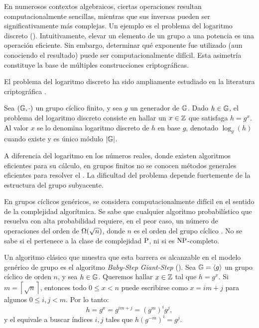 
En numerosos contextos algebraicos, ciertas operaciones resultan computacionalmente sencillas, mientras que sus inversas pueden ser significativamente más complejas. Un ejemplo es el problema del logaritmo discreto (\DLP). Intuitivamente, elevar un elemento de un grupo a una potencia es una operación eficiente. Sin embargo, determinar qué exponente fue utilizado (aun conociendo el resultado) puede ser computacionalmente difícil. Esta asimetría constituye la base de múltiples construcciones criptográficas.

El problema del logaritmo discreto ha sido ampliamente estudiado en la literatura criptográfica \cite{hac,katz}.

\begin{definition}[\DLP]
\label{def:apendice-a-dlp-dlp}
	Sea $(\mathbb{G}, \cdot)$ un grupo cíclico finito, y sea $g$ un generador de $\mathbb{G}$. Dado $h \in \mathbb{G}$, el problema del logaritmo discreto consiste en hallar un $x \in \mathbb{Z}$ que satisfaga $h = g^x$. Al valor $x$ se lo denomina logaritmo discreto de $h$ en base $g$, denotado $\log_g(h)$ cuando existe y es único módulo $|\mathbb{G}|$.
\end{definition}

A diferencia del logaritmo en los números reales, donde existen algoritmos eficientes para su cálculo, en grupos finitos no se conocen métodos generales eficientes para resolver el \DLP. La dificultad del problema depende fuertemente de la estructura del grupo subyacente.

En grupos cíclicos genéricos, \DLP se considera computacionalmente difícil en el sentido de la complejidad algorítmica. Se sabe que cualquier algoritmo probabilístico que resuelva \DLP con alta probabilidad requiere, en el peor caso, un número de operaciones del orden de $\Omega(\sqrt{n})$, donde $n$ es el orden del grupo cíclico \cite{shoup1997lowerbounds}. No se sabe si el \DLP pertenece a la clase de complejidad $\mathrm{P}$, ni si es $\mathrm{NP}$-completo.

Un algoritmo clásico que muestra que esta barrera es alcanzable en el modelo genérico de grupo es el algoritmo \textit{Baby-Step Giant-Step} (\BSGS). Sea $\mathbb{G} = \left\langle g \right\rangle$ un grupo cíclico de orden $n$, y sea $h \in \mathbb{G}$. Queremos hallar $x \in \mathbb{Z}$ tal que $h = g^x$. Si $m = \left\lceil \sqrt{n} \right\rceil$, entonces todo $0 \leq x < n$ puede escribirse como $x = im + j$ para algunos $0 \leq i,j < m$. Por lo tanto:
$$h = g^x = g^{im + j} = (g^m)^i g^j,$$
y el \DLP equivale a buscar índices $i,j$ tales que $h(g^{-m})^i = g^j$.

